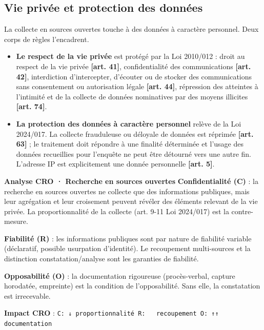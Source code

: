 \subsection{Vie privée et protection des données}

La collecte en sources ouvertes touche à des données à caractère personnel. Deux corps de règles l'encadrent.

\begin{itemize}
\item \textbf{Le respect de la vie privée} est protégé par la Loi 2010/012 : droit au respect de la vie privée \textbf{[art. 41]}, confidentialité des communications \textbf{[art. 42]}, interdiction d'intercepter, d'écouter ou de stocker des communications sans consentement ou autorisation légale \textbf{[art. 44]}, répression des atteintes à l'intimité et de la collecte de données nominatives par des moyens illicites \textbf{[art. 74]}.
\item \textbf{La protection des données à caractère personnel} relève de la Loi 2024/017. La collecte frauduleuse ou déloyale de données est réprimée \textbf{[art. 63]} ; le traitement doit répondre à une finalité déterminée et l'usage des données recueillies pour l'enquête ne peut être détourné vers une autre fin. L'adresse IP est explicitement une donnée personnelle \textbf{[art. 5]}.
\end{itemize}

\begin{boxCRO}
\textbf{Analyse CRO · Recherche en sources ouvertes}
\textbf{Confidentialité (C)} : la recherche en sources ouvertes ne collecte que des informations publiques, mais leur agrégation et leur croisement peuvent révéler des éléments relevant de la vie privée. La proportionnalité de la collecte (art. 9-11 Loi 2024/017) est la contre-mesure.

\textbf{Fiabilité (R)} : les informations publiques sont par nature de fiabilité variable (déclaratif, possible usurpation d'identité). Le recoupement multi-sources et la distinction constatation/analyse sont les garanties de fiabilité.

\textbf{Opposabilité (O)} : la documentation rigoureuse (procès-verbal, capture horodatée, empreinte) est la condition de l'opposabilité. Sans elle, la constatation est irrecevable.

\textbf{Impact CRO} : \texttt{C: ↓ proportionnalité \quad R: ~ recoupement \quad O: ↑↑ documentation}
\end{boxCRO}

